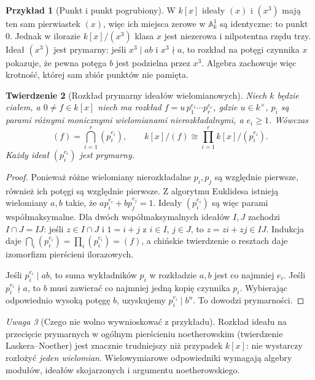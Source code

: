 \documentclass[11pt,a4paper,openany]{report}
\numberwithin{equation}{section}
\theoremstyle{plain}
\newtheorem{twierdzenie}{Twierdzenie}[section]
\theoremstyle{definition}
\newtheorem{przyklad}[twierdzenie]{Przykład}
\theoremstyle{remark}
\newtheorem{uwaga}[twierdzenie]{Uwaga}
\newcommand{\A}{\mathbb A}
\begin{document}
\begin{przyklad}[Punkt i punkt pogrubiony]
W $k[x]$ ideały $(x)$ i $(x^3)$ mają ten sam
pierwiastek $(x)$, więc ich miejsca zerowe
w $\A^1_k$ są identyczne: to punkt $0$.
Jednak w ilorazie $k[x]/(x^3)$ klasa $x$
jest niezerowa i nilpotentna rzędu trzy.
Ideał $(x^3)$ jest prymarny: jeśli $x^3\mid ab$
i $x^3\nmid a$, to rozkład na potęgi czynnika
$x$ pokazuje, że pewna potęga $b$ jest podzielna
przez $x^3$. Algebra zachowuje więc krotność,
której sam zbiór punktów nie pamięta.
\end{przyklad}

\begin{twierdzenie}[Rozkład prymarny ideałów wielomianowych]
\label{tw:primary-kx}
Niech $k$ będzie ciałem, a $0\ne f\in k[x]$
niech ma rozkład
$f=u\,p_1^{e_1}\cdots p_r^{e_r}$,
gdzie $u\in k^\times$, $p_i$ są parami
różnymi monicznymi wielomianami nierozkładalnymi,
a $e_i\ge1$. Wówczas
\[
 (f)=\bigcap_{i=1}^r(p_i^{e_i}),\qquad
 k[x]/(f)\cong\prod_{i=1}^r k[x]/(p_i^{e_i}).
\]
Każdy ideał $(p_i^{e_i})$ jest prymarny.
\end{twierdzenie}
\begin{proof}
Ponieważ różne wielomiany nierozkładalne $p_i,p_j$
są względnie pierwsze, również ich potęgi są
względnie pierwsze. Z algorytmu Euklidesa
istnieją wielomiany $a,b$ takie, że
$ap_i^{e_i}+bp_j^{e_j}=1$.
Ideały $(p_i^{e_i})$ są więc parami współmaksymalne.
Dla dwóch współmaksymalnych ideałów $I,J$
zachodzi $I\cap J=IJ$: jeśli $z\in I\cap J$
i $1=i+j$ z $i\in I$, $j\in J$, to
$z=zi+zj\in IJ$. Indukcja daje
$\bigcap_i(p_i^{e_i})=\prod_i(p_i^{e_i})=(f)$,
a chińskie twierdzenie o resztach daje izomorfizm
pierścieni ilorazowych.

Jeśli $p_i^{e_i}\mid ab$, to suma wykładników
$p_i$ w rozkładzie $a,b$ jest co najmniej $e_i$.
Jeśli $p_i^{e_i}\nmid a$, to $b$ musi zawierać
co najmniej jedną kopię czynnika $p_i$.
Wybierając odpowiednio wysoką potęgę $b$,
uzyskujemy $p_i^{e_i}\mid b^n$.
To dowodzi prymarności.
\end{proof}

\begin{uwaga}[Czego nie wolno wywnioskować z przykładu]
Rozkład ideału na przecięcie prymarnych w ogólnym
pierścieniu noetherowskim (twierdzenie Laskera--Noether)
jest znacznie trudniejszy niż przypadek $k[x]$:
nie wystarczy rozłożyć \emph{jeden wielomian}.
Wielowymiarowe odpowiedniki wymagają
algebry modułów, ideałów skojarzonych i argumentu
noetherowskiego.
\end{uwaga}
\end{document}
